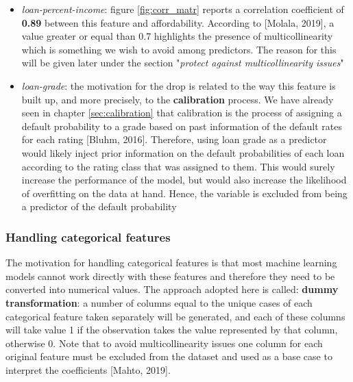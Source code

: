 \documentclass[a4paper,12pt]{article}
\begin{document}
            \begin{itemize}
                \item \textit{loan-percent-income}: figure \ref{fig:corr_matr} reports a correlation coefficient of \textbf{0.89} between this feature and affordability. According to [Molala, 2019], a value greater or equal than 0.7 highlights the presence of multicollinearity which is something we wish to avoid among predictors. The reason for this will be given later under the section "\textit{protect against multicollinearity issues}"
                \item \textit{loan-grade}: the motivation for the drop is related to the way this feature is built up, and more precisely, to the \textbf{calibration} process. We have already seen in chapter \ref{sec:calibration} that calibration is the process of assigning a default probability to a grade based on past information of the default rates for each rating [Bluhm, 2016]. Therefore, using loan grade as a predictor would likely inject prior information on the default probabilities of each loan according to the rating class that was assigned to them. This would surely increase the performance of the model, but would also increase the likelihood of overfitting on the data at hand. Hence, the variable is excluded from being a predictor of the default probability 
            \end{itemize}

        \subsubsection{Handling categorical features}
        The motivation for handling categorical features is that most machine learning
        models cannot work directly with these features and therefore they need to be converted into numerical values. 
        The approach adopted here is called: \textbf{dummy transformation}: a number of columns equal
        to the unique cases of each categorical feature taken separately will be generated, and each of 
        these columns will take value 1 if the observation takes the value represented by that column, otherwise 0.
        Note that to avoid multicollinearity issues one column for each original feature must be excluded from the 
        dataset and used as a base case to interpret the coefficients [Mahto, 2019].

\end{document}
